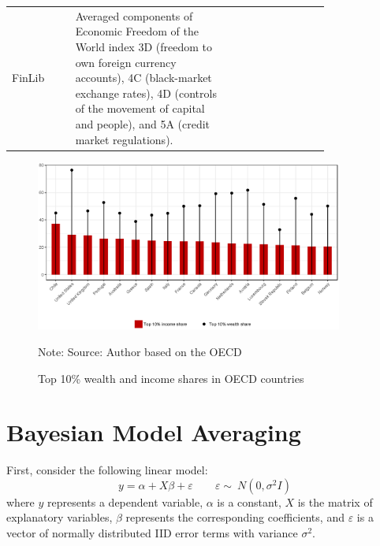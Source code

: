 \begin{refsection}
\begin{subappendices}
\begin{center}
\begin{longtable}{l p{0.50\linewidth} p{0.3\linewidth}}
      FinLib & Averaged components of Economic Freedom of the World index 3D (freedom to own foreign currency accounts), 4C (black-market exchange rates), 4D (controls of the movement of capital and people), and 5A (credit market regulations). & \href{https://www.fraserinstitute.org/economic-freedom/dataset}{\textcite{gwartney2017}} \\
    
    \end{longtable}
    \end{center}
    
    \begin{figure}[ht!]
        \caption{Top 10\% wealth and income shares in \ac{OECD} countries}
        \centering
        \includegraphics[width=0.9\textwidth]{figures/ch3/wealthincome_comp_oecd.eps}
        \label{ch3fig:wealthincome_comp_oecd}
        
        Note: Source: Author based on the \ac{OECD}
    \end{figure}
    
    \newpage
    \section{Bayesian Model Averaging}
    \label{ch3sec:app_bma}
    First, consider the following linear model:
    \begin{equation}\label{ch3eq:OLS}
    y = \alpha + X\beta+ \varepsilon \qquad \varepsilon  \sim\ N(0, \sigma^{2}I)
    \end{equation}
    where $y$ represents a dependent variable, $\alpha$ is a constant, $X$ is the matrix of explanatory variables, $\beta$ represents the corresponding coefficients, and $\varepsilon$ is a vector of normally distributed \ac{IID} error terms with variance $\sigma^{2}$. 
    

\end{subappendices}
\end{refsection}
